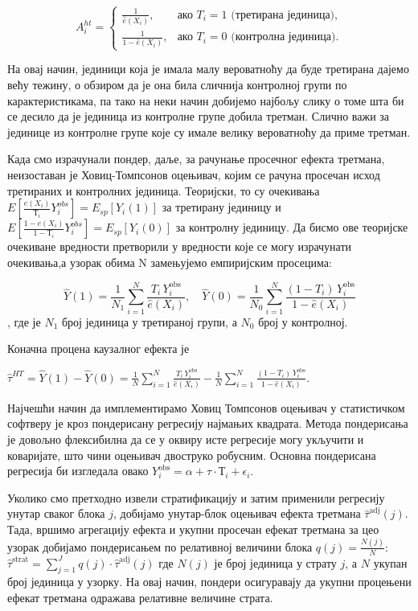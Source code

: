 \documentclass[12pt, a4paper]{article}
\begin{document}
\[
A_i^{ht} =
\begin{cases}
\displaystyle \frac{1}{\hat{e}(X_i)}, & \text{ако } T_i = 1 \text{ (третирана јединица)},\\[2mm]
\displaystyle \frac{1}{1 - \hat{e}(X_i)}, & \text{ако } T_i = 0 \text{ (контролна јединица)}.
\end{cases}
\]


На овај начин, јединици која је имала малу вероватноћу да буде третирана дајемо већу тежину, о обзиром да је она била сличнија контролној групи по карактеристикама, па тако на неки начин добијемо најбољу слику о томе шта би се десило да је јединица из контролне групе добила третман. Слично важи за јединице из контролне групе које су имале велику вероватноћу да приме третман.

Када смо израчунали пондер, даље, за рачунање просечног ефекта третмана, неизоставан је Ховиц-Томпсонов оцењивач, којим се рачуна просечан исход третираних и контролних јединица.  Теоријски, то су очекивања $E\left[ \frac{e(X_i)}{Т_i} Y_i^{obs} \right] = E_{sp}[Y_i(1)]$ за третирану јединицу  и $E\left[ \frac{1 - e(X_i)}{1 - Т_i} Y_i^{obs} \right] = E_{sp}[Y_i(0)]$ за контролну јединицу.  Да бисмо ове теоријске очекиване вредности претворили у вредности које се могу израчунати очекивања,а узорак обима N замењујемо емпиријским просецима:

\[
\hat{Y}(1) = \frac{1}{N_1} \sum_{i=1}^{N} \frac{T_i \, Y_i^{\text{obs}}}{\hat{e}(X_i)}, \quad 
\hat{Y}(0) = \frac{1}{N_0} \sum_{i=1}^{N} \frac{(1 - T_i) \, Y_i^{\text{obs}}}{1 - \hat{e}(X_i)}
\]
, где је $N_1$ број јединица у третираној групи, а  $N_0$ број у контролној.
 
Коначна процена каузалног ефекта је 

$
\hat{\tau}^{HT} 
= \hat{Y}(1) - \hat{Y}(0)
= \frac{1}{N} \sum_{i=1}^{N} \frac{T_i \, Y_i^{\text{obs}}}{\hat{e}(X_i)}
- \frac{1}{N} \sum_{i=1}^{N} \frac{(1 - T_i) \, Y_i^{\text{obs}}}{1 - \hat{e}(X_i)}.
$

Најчешћи начин да имплементирамо Ховиц Томпсонов оцењивач у статистичком софтверу је кроз пондерисану регресију најмањих квадрата. Метода пондерисања је довољно флексибилна да се у оквиру исте регресије могу укључити и коваријате, што чини оцењивач двоструко робусним. Основна пондерисана регресија би изгледала овако $Y_i^{\text{obs}} = \alpha + \tau \cdot Т_i + \epsilon_i$.

Уколико смо претходно извели стратификацију и затим применили регресију унутар сваког блока $j$, добијамо унутар-блок оцењивач ефекта третмана $\hat{\tau}^{\text{adj}}(j)$.  
Тада, вршимо агрегацију ефекта и укупни просечан ефекат третмана за цео узорак добијамо пондерисањем по релативној величини блока $q(j) = \frac{N(j)}{N}$:
$\hat{\tau}^{\text{strat}} = \sum_{j=1}^{J} q(j) \cdot \hat{\tau}^{\text{adj}}(j)$ где $N(j)$ је број јединица у страту $j$, а $N$ укупан број јединица у узорку.  
На овај начин, пондери осигуравају да укупни процењени ефекат третмана одражава релативне величине страта.
\end{document}

